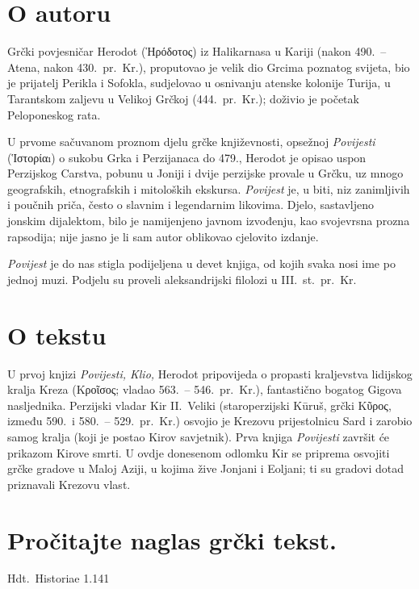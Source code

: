 \section*{O autoru}

Grčki povjesničar Herodot (Ἡρόδοτος) iz Halikarnasa u Kariji (nakon 490.\ – Atena, nakon 430.\ pr.~Kr.), proputovao je velik dio Grcima poznatog svijeta, bio je prijatelj Perikla i Sofokla, sudjelovao u osnivanju atenske kolonije Turija, u Tarantskom zaljevu u Velikoj Grčkoj (444.\ pr.~Kr.); doživio je početak Peloponeskog rata.

U prvome sačuvanom proznom djelu grčke književnosti, opsežnoj \textit{Povijesti} (Ἱστορίαı) o sukobu Grka i Perzijanaca do 479., Herodot je opisao uspon Perzijskog Carstva, pobunu u Joniji i dvije perzijske provale u Grčku, uz mnogo geografskih, etnografskih i mitoloških ekskursa. \textit{Povijest} je, u biti, niz zanimljivih i poučnih priča, često o slavnim i legendarnim likovima. Djelo, sastavljeno jonskim dijalektom, bilo je namijenjeno javnom izvođenju, kao svojevrsna prozna rapsodija; nije jasno je li sam autor oblikovao cjelovito izdanje. 

\textit{Povijest} je do nas stigla podijeljena u devet knjiga, od kojih svaka nosi ime po jednoj muzi. Podjelu su proveli aleksandrijski filolozi u III.~st.\ pr.~Kr.

\section*{O tekstu}

U prvoj knjizi \textit{Povijesti, Klio,} Herodot pripovijeda o propasti kraljevstva lidijskog kralja Kreza (Κροῖσος; vladao 563.\ – 546.\ pr.~Kr.), fantastično bogatog Gigova nasljednika. Perzijski vladar Kir II.\ Veliki (staroperzijski Kūruš, grčki Κῦρος, između 590.\ i 580.\ – 529.\ pr.~Kr.) osvojio je Krezovu prijestolnicu Sard i zarobio samog kralja (koji je postao Kirov savjetnik). Prva knjiga \textit{Povijesti} završit će prikazom Kirove smrti. U ovdje donesenom odlomku Kir se priprema osvojiti grčke gradove u Maloj Aziji, u kojima žive Jonjani i Eoljani; ti su gradovi dotad priznavali Krezovu vlast.


\section*{Pročitajte naglas grčki tekst.}

Hdt.\ Historiae 1.141


